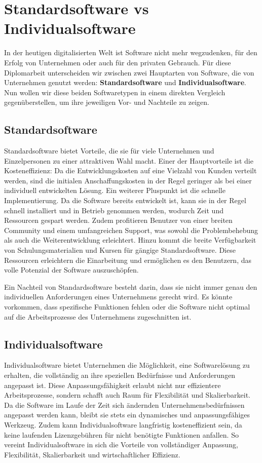 \section {Standardsoftware vs Individualsoftware}

In der heutigen digitalisierten Welt ist Software nicht mehr wegzudenken,
für den Erfolg von Unternehmen oder auch für den privaten Gebrauch.
Für diese Diplomarbeit unterscheiden wir zwischen zwei Hauptarten von Software, 
die von Unternehmen genutzt werden: 
\textbf{Standardsoftware} und 
\textbf{Individualsoftware}.
Nun wollen wir diese beiden Softwaretypen in einem direkten 
Vergleich gegenüberstellen, um ihre jeweiligen Vor- und Nachteile zu zeigen.

\subsection*{Standardsoftware}

Standardsoftware bietet Vorteile, die sie für viele Unternehmen und Einzelpersonen 
zu einer attraktiven Wahl macht. Einer der Hauptvorteile ist die Kosteneffizienz: 
Da die Entwicklungskosten auf eine Vielzahl von Kunden verteilt werden, sind die initialen 
Anschaffungskosten in der Regel geringer als bei einer individuell entwickelten Lösung. 
Ein weiterer Pluspunkt ist die schnelle Implementierung. Da die Software bereits entwickelt ist, 
kann sie in der Regel schnell installiert und in Betrieb genommen werden, 
wodurch Zeit und Ressourcen gespart werden. Zudem profitieren Benutzer von einer 
breiten Community und einem umfangreichen Support, was sowohl die Problembehebung 
als auch die Weiterentwicklung erleichtert. Hinzu kommt die breite Verfügbarkeit von 
Schulungsmaterialien und Kursen für gängige Standardsoftware. 
Diese Ressourcen erleichtern die Einarbeitung und ermöglichen es den Benutzern, 
das volle Potenzial der Software auszuschöpfen.

Ein Nachteil von Standardsoftware besteht darin, dass sie nicht immer genau 
den individuellen Anforderungen eines Unternehmens gerecht wird. 
Es könnte vorkommen, dass spezifische Funktionen fehlen oder die Software 
nicht optimal auf die Arbeitsprozesse des Unternehmens zugeschnitten ist.

\newpage
\subsection*{Individualsoftware}

Individualsoftware bietet Unternehmen die Möglichkeit, eine Softwarelösung 
zu erhalten, die vollständig an ihre speziellen Bedürfnisse und Anforderungen angepasst ist. 
Diese Anpassungsfähigkeit erlaubt nicht nur effizientere Arbeitsprozesse, 
sondern schafft auch Raum für Flexibilität und Skalierbarkeit. 
Da die Software im Laufe der Zeit sich ändernden Unternehmensbedürfnissen angepasst werden kann, 
bleibt sie stets ein dynamisches und anpassungsfähiges Werkzeug. 
Zudem kann Individualsoftware langfristig kosteneffizient sein, da keine laufenden 
Lizenzgebühren für nicht benötigte Funktionen anfallen. 
So vereint Individualsoftware in sich die Vorteile von vollständiger Anpassung, 
Flexibilität, Skalierbarkeit und wirtschaftlicher Effizienz.

